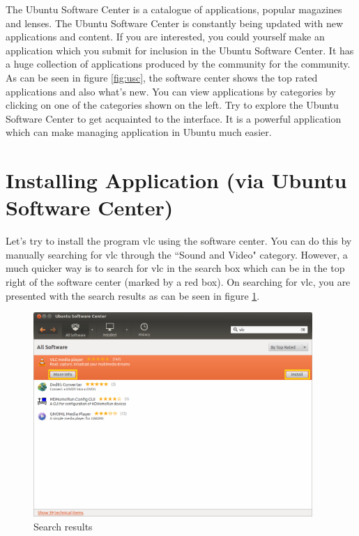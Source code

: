 \par \noindent The Ubuntu Software Center is a catalogue of applications, popular magazines and lenses. The Ubuntu Software Center is constantly being updated with new applications and content. If you are interested, you could yourself make an application which you submit for inclusion in the Ubuntu Software Center. It has a huge collection of applications produced by the community for the community. As can be seen in figure \ref{fig:usc}, the software center shows the top rated applications and also what's new. You can view applications by categories by clicking on one of the categories shown on the left. Try to explore the Ubuntu Software Center to get acquainted to the interface. It is a powerful application which can make managing application in Ubuntu much easier.\\

\section{Installing Application (via Ubuntu Software Center)} \label{sect:install-via-usc}

Let's try to install the program vlc using the software center.  You can do this by manually searching for vlc through the ``Sound and Video" category. However, a much quicker way is to search for vlc in the search box which can be in the top right of the software center (marked by a red box). On searching for vlc, you are presented with the search results as can be seen in figure \ref{fig:vlc-search}. 

\begin{figure}[h!]	
	\centering
	\includegraphics[width=300pt]{./images/applications/vlc-search.png}
	\caption{Search results}	
	\label{fig:vlc-search}		
\end{figure}

